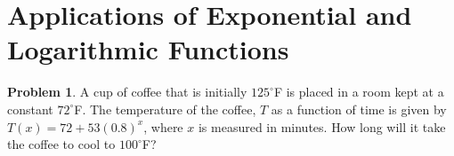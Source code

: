 \documentclass[11pt]{scrartcl}
\theoremstyle{definition}
\newtheorem{problem}[theorem]{Problem}
\begin{document}
%
%
%
%
%
%
%
%
%
%
%
%
%
%
%
%

\section*{Applications of Exponential and Logarithmic Functions}
\begin{problem}
	A cup of coffee that is initially $125^\circ$F is placed in a room kept at a constant $72^\circ$F. The temperature of the coffee, $T$ as a function of time is given by $T(x)=72+53(0.8)^x$, where $x$ is measured in minutes. How long will it take the coffee to cool to $100^\circ$F?
\end{problem}
\end{document}

